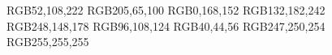 \documentclass[11pt]{article}
\theoremstyle{definition}
\numberwithin{equation}{section}%
\begin{document}
\begin{figure}[htbp]
    \centering

\definecolor{mBlue}  {RGB}{52,108,222}
\definecolor{mPink}  {RGB}{205,65,100}
\definecolor{mTeal}  {RGB}{0,168,152}
\definecolor{mLBlue} {RGB}{132,182,242}
\definecolor{mLPink} {RGB}{248,148,178}
\definecolor{mSlate} {RGB}{96,108,124}
\definecolor{mDark}  {RGB}{40,44,56}
\definecolor{mBg}    {RGB}{247,250,254}
\definecolor{mCard}  {RGB}{255,255,255}


\end{figure}
\end{document}
